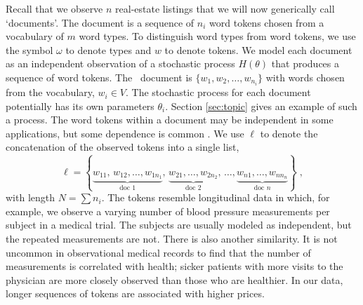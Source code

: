 \documentclass[12pt]{article}
\begin{document}
 Recall that we observe $n$ real-estate listings that we will now generically
 call `documents'.  The \ith document is a sequence of $n_i$ word tokens 
 chosen from a vocabulary of $m$ word types.  To distinguish word types
 from word tokens, we use the symbol $\omega$ to denote types and $w$ to denote
 tokens.  We model each document as an independent observation of a stochastic
 process $H(\theta)$ that produces a sequence of word tokens.
  The \ith\ document is $\{w_1, w_2, \ldots, w_{n_i}\}$ with
 words chosen from the vocabulary, $w_i \in V$.  The stochastic process for each document 
 potentially has its own parameters $\theta_i$.  Section \ref{sec:topic} gives an example of such a
 process.  The word tokens within a document may be independent in some
 applications, but some dependence is common \citep[\eg][]{fosterkakade07}.
 We use $\ell$ to denote the concatenation of the observed tokens into a single list,
\begin{equation*}
   \ell = \left\{ \underbrace{w_{11},\,w_{12},\ldots,w_{1n_1}}_{\mbox{doc 1}},\,
            \underbrace{w_{21},\ldots,w_{2n_2}}_{\mbox{doc 2}}, \,
            \ldots, \underbrace{w_{n1},\ldots,w_{nn_n}}_{\mbox{doc }n} \right\}\;,
\end{equation*}
 with length $N = \sum n_i$.  The tokens resemble
  longitudinal data in which, for example, we observe a varying number
 of blood pressure measurements per subject in a medical trial.
 The subjects are usually modeled as independent,
 but the repeated measurements are not.  There is also another similarity. It is not uncommon in observational medical records to find that
 the number of measurements is correlated with health; sicker
 patients with more visits to the physician are more closely observed than those who are healthier.  In our data, longer sequences of tokens are associated with higher prices.
\end{document}
